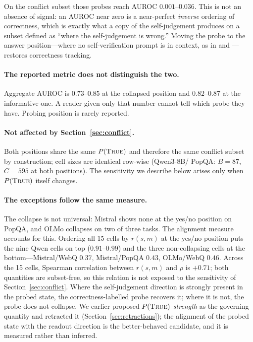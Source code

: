 \documentclass[10pt]{article}
\newcommand{\ptrue}{P(\textsc{True})}
\begin{document}
On the conflict subset those probes reach AUROC $0.001$--$0.036$. This is not an absence of signal:
an AUROC near zero is a near-perfect \emph{inverse} ordering of correctness, which is exactly what a
copy of the self-judgement produces on a subset defined as ``where the self-judgement is wrong.''
Moving the probe to the answer position---where no self-verification prompt is in context, as in
\citet{azaria2023internal} and \citet{orgad2024llms}---restores correctness tracking.

\paragraph{The reported metric does not distinguish the two.} Aggregate AUROC is $0.73$--$0.85$ at
the collapsed position and $0.82$--$0.87$ at the informative one. A reader given only that number
cannot tell which probe they have. Probing position is rarely reported.

\paragraph{Not affected by Section~\ref{sec:conflict}.} Both positions share the same $\ptrue{}$ and
therefore the same conflict subset by construction; cell sizes are identical row-wise (Qwen3-8B/
PopQA: $B{=}87$, $C{=}595$ at both positions). The sensitivity we describe below arises only when
$\ptrue{}$ itself changes.

\paragraph{The exceptions follow the same measure.} The collapse is not universal: Mistral shows
none at the yes/no position on PopQA, and OLMo collapses on two of three tasks. The alignment
measure accounts for this. Ordering all 15 cells by $r(s,m)$ at the yes/no position puts the nine
Qwen cells on top ($0.91$--$0.99$) and the three non-collapsing cells at the bottom---Mistral/WebQ
$0.37$, Mistral/PopQA $0.43$, OLMo/WebQ $0.46$. Across the 15 cells, Spearman correlation between
$r(s,m)$ and $\rho$ is $+0.71$; both quantities are subset-free, so this relation is not exposed to
the sensitivity of Section~\ref{sec:conflict}. Where the self-judgement direction is strongly
present in the probed state, the correctness-labelled probe recovers it; where it is not, the probe
does not collapse. We earlier proposed $\ptrue{}$ \emph{strength} as the governing quantity and
retracted it (Section~\ref{sec:retractions}); the alignment of the probed state with the readout
direction is the better-behaved candidate, and it is measured rather than inferred.
\end{document}
